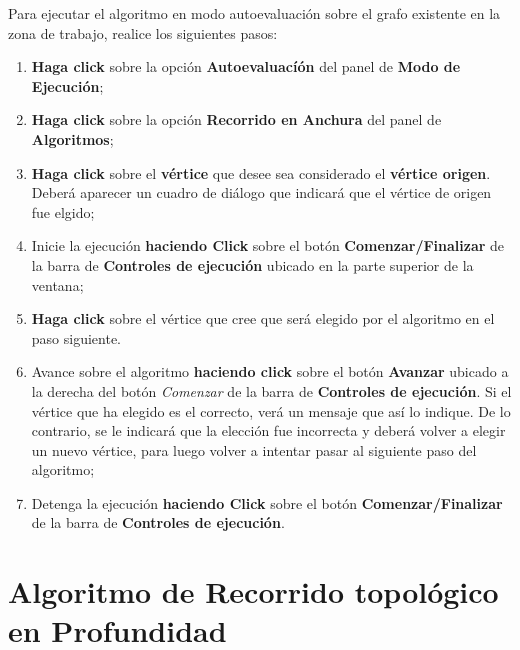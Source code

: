 \documentclass{book}
\begin{document}
Para ejecutar el algoritmo en modo autoevaluación sobre el grafo existente en la zona de trabajo, realice los siguientes pasos:
\medskip

\begin{enumerate}
	\itemsep=8pt \topsep=0pt \partopsep=0pt \parskip=0pt \parsep=0pt

	\item \textbf{Haga click} sobre la opción \textbf{Autoevaluacíón} del panel de \textbf{Modo de Ejecución};

	\item \textbf{Haga click} sobre la opción \textbf{Recorrido en Anchura} del panel de \textbf{Algoritmos};

	\item \textbf{Haga click} sobre el \textbf{vértice} que desee sea considerado el \textbf{vértice origen}. Deberá aparecer un cuadro de diálogo que indicará que el vértice de origen fue elgido;

	\item Inicie la ejecución \textbf{haciendo Click} sobre el botón \textbf{Comenzar/Finalizar} de la barra de \textbf{Controles de ejecución} ubicado en la parte superior de la ventana;

	\item \textbf{Haga click} sobre el vértice que cree que será elegido por el algoritmo en el paso siguiente.

	\item Avance sobre el algoritmo \textbf{haciendo click} sobre el botón \textbf{Avanzar} ubicado a la derecha del botón \textit{Comenzar} de la barra de \textbf{Controles de ejecución}. Si el vértice que ha elegido es el correcto, verá un mensaje que así lo indique. De lo contrario, se le indicará que la elección fue incorrecta y deberá volver a elegir un nuevo vértice, para luego volver a intentar pasar al siguiente paso del algoritmo;

	\item Detenga la ejecución \textbf{haciendo Click} sobre el botón \textbf{Comenzar/Finalizar} de la barra de \textbf{Controles de ejecución}.

\end{enumerate}
\medskip



%
%
\chapter{Algoritmo de Recorrido topológico en Profundidad}
\end{document}

